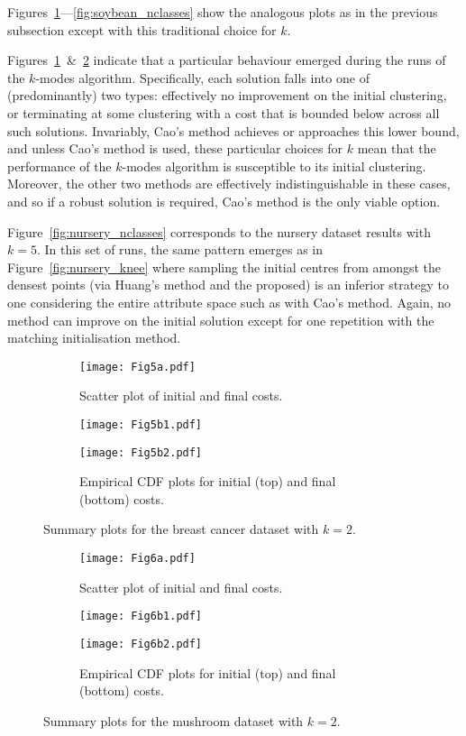 Figures~\ref{fig:breast_cancer_nclasses}---\ref{fig:soybean_nclasses} show the
analogous plots as in the previous subsection except with this traditional
choice for \(k\).

Figures~\ref{fig:breast_cancer_nclasses}~\&~\ref{fig:mushroom_nclasses} indicate
that a particular behaviour emerged during the runs of the \(k\)-modes
algorithm. Specifically, each solution falls into one of (predominantly) two
types: effectively no improvement on the initial clustering, or terminating at
some clustering with a cost that is bounded below across all such solutions.
Invariably, Cao's method achieves or approaches this lower bound, and unless
Cao's method is used, these particular choices for \(k\) mean that the
performance of the \(k\)-modes algorithm is susceptible to its initial
clustering. Moreover, the other two methods are effectively indistinguishable in
these cases, and so if a robust solution is required, Cao's method is the only
viable option.

Figure~\ref{fig:nursery_nclasses} corresponds to the nursery dataset results
with \(k=5\). In this set of runs, the same pattern emerges as in
Figure~\ref{fig:nursery_knee} where sampling the initial centres from amongst
the densest points (via Huang's method and the proposed) is an inferior strategy
to one considering the entire attribute space such as with Cao's method. Again,
no method can improve on the initial solution except for one repetition with the
matching initialisation method.

\begin{figure}
    \begin{subfigure}{.5\textwidth}
        \texttt{[image: Fig5a.pdf]}
        \caption{Scatter plot of initial and final costs.}
    \end{subfigure}
    \hfill%
    \begin{subfigure}{.5\textwidth}
        \texttt{[image: Fig5b1.pdf]}

        \texttt{[image: Fig5b2.pdf]}
        \caption{Empirical CDF plots for initial (top) and final (bottom)
                 costs.}
    \end{subfigure}
    \caption{Summary plots for the breast cancer dataset with \(k=2\).}%
    \label{fig:breast_cancer_nclasses}
\end{figure}

\begin{figure}
    \begin{subfigure}{.5\textwidth}
        \texttt{[image: Fig6a.pdf]}
        \caption{Scatter plot of initial and final costs.}
    \end{subfigure}
    \hfill%
    \begin{subfigure}{.5\textwidth}
        \texttt{[image: Fig6b1.pdf]}

        \texttt{[image: Fig6b2.pdf]}
        \caption{Empirical CDF plots for initial (top) and final (bottom)
                 costs.}
    \end{subfigure}
    \caption{Summary plots for the mushroom dataset with \(k=2\).}%
    \label{fig:mushroom_nclasses}
\end{figure}

